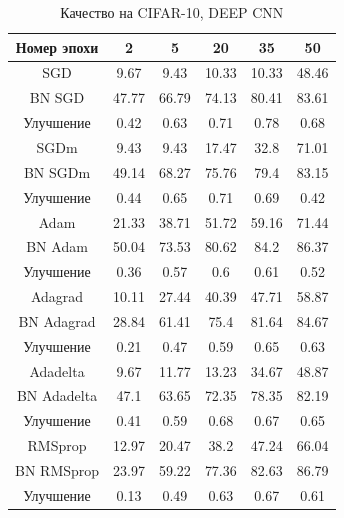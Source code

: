 \documentclass[12pt]{article}
\begin{document}
\begin{table}
\centering
\begin{tabular}{|c|c|c|c|c|c|}\hline
\textbf{Номер эпохи} & \textbf{2} & \textbf{5} & \textbf{20} & \textbf{35} & \textbf{50} \\\hline\hline
SGD & 9.67 & 9.43 & 10.33 & 10.33 & 48.46 \\\hline
BN SGD & 47.77 & 66.79 & 74.13 & 80.41 & 83.61 \\\hline
Улучшение & 0.42 & 0.63 & 0.71 & 0.78 & 0.68 \\\hline\hline
SGDm & 9.43 & 9.43 & 17.47 & 32.8 & 71.01 \\\hline
BN SGDm & 49.14 & 68.27 & 75.76 & 79.4 & 83.15 \\\hline
Улучшение & 0.44 & 0.65 & 0.71 & 0.69 & 0.42 \\\hline\hline
Adam & 21.33 & 38.71 & 51.72 & 59.16 & 71.44 \\\hline
BN Adam & 50.04 & 73.53 & 80.62 & 84.2 & 86.37 \\\hline
Улучшение & 0.36 & 0.57 & 0.6 & 0.61 & 0.52 \\\hline\hline
Adagrad & 10.11 & 27.44 & 40.39 & 47.71 & 58.87 \\\hline
BN Adagrad & 28.84 & 61.41 & 75.4 & 81.64 & 84.67 \\\hline
Улучшение & 0.21 & 0.47 & 0.59 & 0.65 & 0.63 \\\hline\hline
Adadelta & 9.67 & 11.77 & 13.23 & 34.67 & 48.87 \\\hline
BN Adadelta & 47.1 & 63.65 & 72.35 & 78.35 & 82.19 \\\hline
Улучшение & 0.41 & 0.59 & 0.68 & 0.67 & 0.65 \\\hline\hline
RMSprop & 12.97 & 20.47 & 38.2 & 47.24 & 66.04 \\\hline
BN RMSprop & 23.97 & 59.22 & 77.36 & 82.63 & 86.79 \\\hline
Улучшение & 0.13 & 0.49 & 0.63 & 0.67 & 0.61 \\\hline
\end{tabular}
\caption{Качество на CIFAR-10, DEEP CNN}
\end{table}
\end{document}
